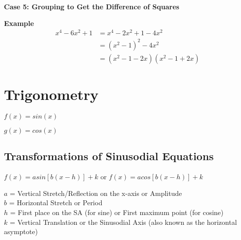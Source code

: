 \documentclass[12pt]{article}
\begin{document}
\textbf{Case 5: Grouping to Get the Difference of Squares}
\begin{tcolorbox}
	\textbf{Example}
	\begin{align*}
		x^4-6x^2+1&=x^4-2x^2+1-4x^2 \\
		&=(x^2-1)^2-4x^2 \\
		&=(x^2-1-2x)(x^2-1+2x)
	\end{align*}
\end{tcolorbox}

\section{Trigonometry}
\begin{center}
	$f(x)=sin(x)$
\end{center}

\begin{center}
	$g(x)=cos(x)$
\end{center}

\subsection{Transformations of Sinusodial Equations}

\begin{tcolorbox}
	\begin{center}
		$f(x)=asin[b(x-h)] + k$ or $f(x)=acos[b(x-h)] + k$
	\end{center}
	$a$ = Vertical Stretch/Reflection on the x-axis or Amplitude \\
	$b$ = Horizontal Stretch or Period \\
	$h$ = First place on the SA (for sine) or First maximum point (for cosine) \\
	$k$ = Vertical Translation or the Sinusodial Axis (also known as the horizontal asymptote)
\end{tcolorbox}
\end{document}
